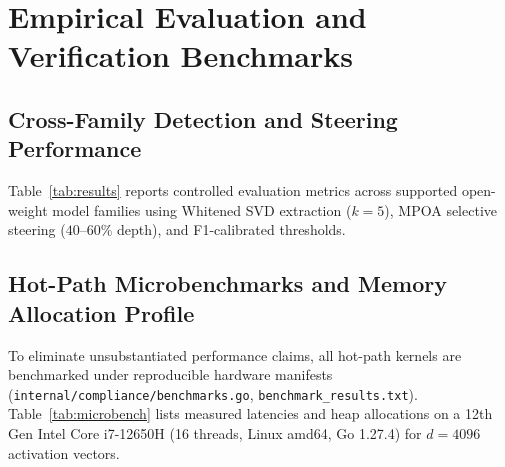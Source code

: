 \documentclass{article}
\begin{document}
\section{Empirical Evaluation and Verification Benchmarks}

\subsection{Cross-Family Detection and Steering Performance}

Table~\ref{tab:results} reports controlled evaluation metrics across supported open-weight model families using Whitened SVD extraction ($k=5$), MPOA selective steering ($40$--$60\%$ depth), and F1-calibrated thresholds.

\begin{table}[h]
    \centering
    \caption{BurnNotice v0.8 controlled evaluation across model families (same-model profiling).}
    \label{tab:results}
\end{table}

\subsection{Hot-Path Microbenchmarks and Memory Allocation Profile}

To eliminate unsubstantiated performance claims, all hot-path kernels are benchmarked under reproducible hardware manifests (\texttt{internal/compliance/benchmarks.go}, \texttt{benchmark\_results.txt}). Table~\ref{tab:microbench} lists measured latencies and heap allocations on a 12th Gen Intel Core i7-12650H (16 threads, Linux amd64, Go 1.27.4) for $d = 4096$ activation vectors.
\end{document}
